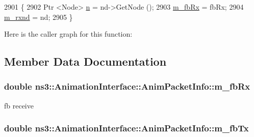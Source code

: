 \begin{DoxyCode}
2901 \{
2902   Ptr <Node> \hyperlink{namespacesample-rng-plot_aeb5ee5c431e338ef39b7ac5431242e1d}{n} = nd->GetNode ();
2903   \hyperlink{classns3_1_1AnimationInterface_1_1AnimPacketInfo_a616697a7118e5d546155a7117ef15545}{m\_fbRx} = fbRx;
2904   \hyperlink{classns3_1_1AnimationInterface_1_1AnimPacketInfo_ab191a48aaf2b4232476f9c99eda73de7}{m\_rxnd} = nd;
2905 \}
\end{DoxyCode}


Here is the caller graph for this function\+:




\subsection{Member Data Documentation}
\subsubsection[{\texorpdfstring{m\+\_\+fb\+Rx}{m_fbRx}}]{\setlength{\rightskip}{0pt plus 5cm}double ns3\+::\+Animation\+Interface\+::\+Anim\+Packet\+Info\+::m\+\_\+fb\+Rx}\hypertarget{classns3_1_1AnimationInterface_1_1AnimPacketInfo_a616697a7118e5d546155a7117ef15545}{}\label{classns3_1_1AnimationInterface_1_1AnimPacketInfo_a616697a7118e5d546155a7117ef15545}


fb receive 

\subsubsection[{\texorpdfstring{m\+\_\+fb\+Tx}{m_fbTx}}]{\setlength{\rightskip}{0pt plus 5cm}double ns3\+::\+Animation\+Interface\+::\+Anim\+Packet\+Info\+::m\+\_\+fb\+Tx}\hypertarget{classns3_1_1AnimationInterface_1_1AnimPacketInfo_a36cd07b0281a2f7318714ad9f99ee908}{}\label{classns3_1_1AnimationInterface_1_1AnimPacketInfo_a36cd07b0281a2f7318714ad9f99ee908}


